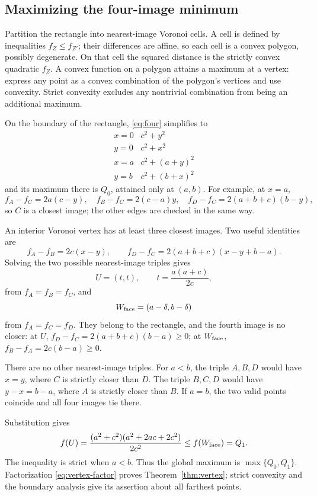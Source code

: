 \documentclass[11pt]{article}
\theoremstyle{definition}
\newcommand{\sqzero}{Q_0}
\newcommand{\sqone}{Q_1}
\begin{document}
\subsection{Maximizing the four-image minimum}

Partition the rectangle into nearest-image Voronoi cells. A cell is
defined by inequalities \(f_Z\le f_{Z'}\); their differences are
affine, so each cell is a convex polygon, possibly degenerate.
On that cell the squared distance is the strictly convex quadratic
\(f_Z\). A convex function on a polygon attains a maximum at a vertex:
express any point as a convex combination of the polygon's vertices
and use convexity. Strict convexity excludes any nontrivial
combination from being an additional maximum.

On the boundary of the rectangle, \eqref{eq:four} simplifies to
\[
\begin{array}{c|c}
x=0&c^2+y^2\\
y=0&c^2+x^2\\
x=a&c^2+(a+y)^2\\
y=b&c^2+(b+x)^2
\end{array}
\]
and its maximum there is \(\sqzero\), attained only at \((a,b)\).
For example, at \(x=a\),
\[
f_A-f_C=2a(c-y),\quad f_B-f_C=2(c-a)y,\quad
f_D-f_C=2(a+b+c)(b-y),
\]
so \(C\) is a closest image; the other edges are checked in the same way.

An interior Voronoi vertex has at least three closest images.
Two useful identities are
\[
f_A-f_B=2c(x-y),\qquad
f_D-f_C=2(a+b+c)(x-y+b-a).
\]
Solving the two possible nearest-image triples gives
\[
U=(t,t),\qquad t=\frac{a(a+c)}{2c},
\]
from \(f_A=f_B=f_C\), and
\[
W_{\rm face}=(a-\delta,b-\delta)
\]
from \(f_A=f_C=f_D\).
They belong to the rectangle, and the fourth image is no closer:
at \(U\), \(f_D-f_C=2(a+b+c)(b-a)\ge0\); at \(W_{\rm face}\),
\(f_B-f_A=2c(b-a)\ge0\).

There are no other nearest-image triples. For \(a<b\), the triple
\(A,B,D\) would have \(x=y\), where \(C\) is strictly closer than \(D\).
The triple \(B,C,D\) would have \(y-x=b-a\), where \(A\) is strictly
closer than \(B\). If \(a=b\), the two valid points coincide and all
four images tie there.

Substitution gives
\[
f(U)=\frac{(a^2+c^2)(a^2+2ac+2c^2)}{2c^2}
\le
f(W_{\rm face})=\sqone.
\]
The inequality is strict when \(a<b\). Thus the global maximum is
\(\max\{\sqzero,\sqone\}\). Factorization \eqref{eq:vertex-factor}
proves Theorem~\ref{thm:vertex}; strict convexity and the boundary
analysis give its assertion about all farthest points.
\end{document}

